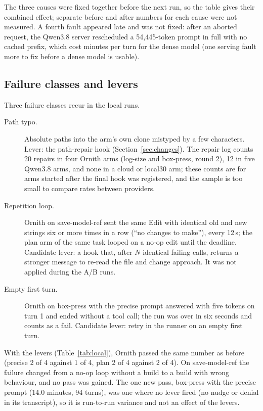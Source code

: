 The three causes were fixed together before the next run, so the table gives their combined effect; separate before and
after numbers for each cause were not measured. A fourth fault appeared late and was not fixed: after an aborted
request, the Qwen3.8 server rescheduled a 54{,}445-token prompt in full with no cached prefix, which cost minutes per
turn for the dense model (one serving fault more to fix before a dense model is usable).

\subsection{Failure classes and levers}\label{sec:failures}

Three failure classes recur in the local runs.
\begin{description}
	\item[Path typo.] Absolute paths into the arm's own clone mistyped by a few characters. Lever: the path-repair hook
	(Section~\ref{sec:changes}). The repair log counts 20 repairs in four Ornith arms (log-size and box-press, round 2), 12 in five Qwen3.8 arms, and none
in a cloud or local30 arm; these counts are for arms started after the final hook was registered, and the sample is
too small to compare rates between providers.
	\item[Repetition loop.] Ornith on save-model-ref sent the same Edit with identical old and new strings six or more
	times in a row (``no changes to make''), every 12\,s; the plan arm of the same task looped on a no-op edit until the
	deadline. Candidate lever: a hook that, after $N$ identical failing calls, returns a stronger message to re-read the
	file and change approach. It was not applied during the A/B runs.
	\item[Empty first turn.] Ornith on box-press with the precise prompt answered with five tokens on turn 1 and ended
	without a tool call; the run was over in six seconds and counts as a fail. Candidate lever: retry in the runner on an
	empty first turn.
\end{description}
With the levers (Table~\ref{tab:local}), Ornith passed the same number as before (precise 2 of 4 against 1 of 4, plan 2
of 4 against 2 of 4). On save-model-ref the failure changed from a no-op loop without a build to a build with wrong
behaviour, and no pass was gained. The one new pass, box-press with the precise prompt (14.0 minutes, 94 turns), was one
where no lever fired (no nudge or denial in its transcript), so it is run-to-run variance and not an effect of the levers.

